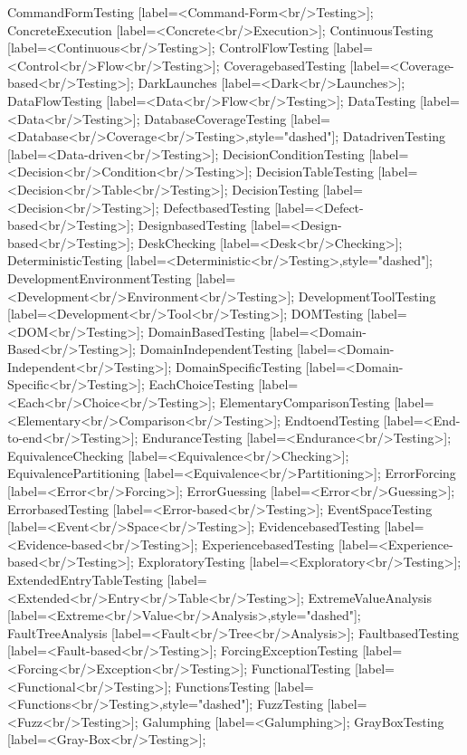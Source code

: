 \documentclass{article}
\begin{document}
{CommandFormTesting [label=<Command-Form<br/>Testing>];
ConcreteExecution [label=<Concrete<br/>Execution>];
ContinuousTesting [label=<Continuous<br/>Testing>];
ControlFlowTesting [label=<Control<br/>Flow<br/>Testing>];
CoveragebasedTesting [label=<Coverage-based<br/>Testing>];
DarkLaunches [label=<Dark<br/>Launches>];
DataFlowTesting [label=<Data<br/>Flow<br/>Testing>];
DataTesting [label=<Data<br/>Testing>];
DatabaseCoverageTesting [label=<Database<br/>Coverage<br/>Testing>,style="dashed"];
DatadrivenTesting [label=<Data-driven<br/>Testing>];
DecisionConditionTesting [label=<Decision<br/>Condition<br/>Testing>];
DecisionTableTesting [label=<Decision<br/>Table<br/>Testing>];
DecisionTesting [label=<Decision<br/>Testing>];
DefectbasedTesting [label=<Defect-based<br/>Testing>];
DesignbasedTesting [label=<Design-based<br/>Testing>];
DeskChecking [label=<Desk<br/>Checking>];
DeterministicTesting [label=<Deterministic<br/>Testing>,style="dashed"];
DevelopmentEnvironmentTesting [label=<Development<br/>Environment<br/>Testing>];
DevelopmentToolTesting [label=<Development<br/>Tool<br/>Testing>];
DOMTesting [label=<DOM<br/>Testing>];
DomainBasedTesting [label=<Domain-Based<br/>Testing>];
DomainIndependentTesting [label=<Domain-Independent<br/>Testing>];
DomainSpecificTesting [label=<Domain-Specific<br/>Testing>];
EachChoiceTesting [label=<Each<br/>Choice<br/>Testing>];
ElementaryComparisonTesting [label=<Elementary<br/>Comparison<br/>Testing>];
EndtoendTesting [label=<End-to-end<br/>Testing>];
EnduranceTesting [label=<Endurance<br/>Testing>];
EquivalenceChecking [label=<Equivalence<br/>Checking>];
EquivalencePartitioning [label=<Equivalence<br/>Partitioning>];
ErrorForcing [label=<Error<br/>Forcing>];
ErrorGuessing [label=<Error<br/>Guessing>];
ErrorbasedTesting [label=<Error-based<br/>Testing>];
EventSpaceTesting [label=<Event<br/>Space<br/>Testing>];
EvidencebasedTesting [label=<Evidence-based<br/>Testing>];
ExperiencebasedTesting [label=<Experience-based<br/>Testing>];
ExploratoryTesting [label=<Exploratory<br/>Testing>];
ExtendedEntryTableTesting [label=<Extended<br/>Entry<br/>Table<br/>Testing>];
ExtremeValueAnalysis [label=<Extreme<br/>Value<br/>Analysis>,style="dashed"];
FaultTreeAnalysis [label=<Fault<br/>Tree<br/>Analysis>];
FaultbasedTesting [label=<Fault-based<br/>Testing>];
ForcingExceptionTesting [label=<Forcing<br/>Exception<br/>Testing>];
FunctionalTesting [label=<Functional<br/>Testing>];
FunctionsTesting [label=<Functions<br/>Testing>,style="dashed"];
FuzzTesting [label=<Fuzz<br/>Testing>];
Galumphing [label=<Galumphing>];
GrayBoxTesting [label=<Gray-Box<br/>Testing>];
}
\end{document}
